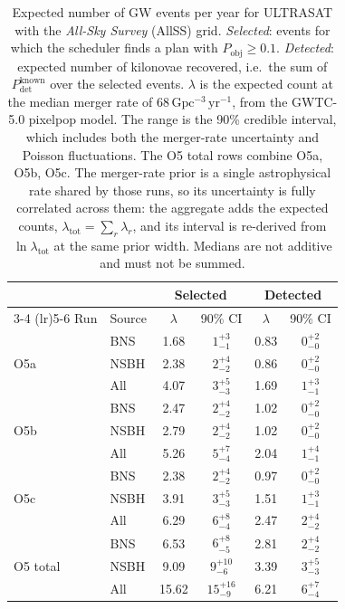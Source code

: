 \begin{table}[!htb]
\centering
\renewcommand\arraystretch{1.15}
\setlength{\tabcolsep}{0.22cm}
\caption{Expected number of GW events per year for ULTRASAT with the \emph{All-Sky Survey} (AllSS) grid. \emph{Selected}: events for which the scheduler finds a plan with $P_\mathrm{obj} \geq 0.1$. \emph{Detected}: expected number of kilonovae recovered, i.e.\ the sum of $P_\mathrm{det}^\mathrm{known}$ over the selected events. $\lambda$ is the expected count at the median merger rate of 68\,$\mathrm{Gpc^{-3}\,yr^{-1}}$, from the GWTC-5.0 pixelpop model. The range is the 90\% credible interval, which includes both the merger-rate uncertainty and Poisson fluctuations. The O5 total rows combine O5a, O5b, O5c. The merger-rate prior is a single astrophysical rate shared by those runs, so its uncertainty is fully correlated across them: the aggregate adds the expected counts, $\lambda_\mathrm{tot} = \sum_r \lambda_r$, and its interval is re-derived from $\ln \lambda_\mathrm{tot}$ at the same prior width. Medians are not additive and must not be summed.}
\label{tab:ultrasat-allsky-selected-detected-1yr}
\begin{tabular}{llcccc}
\toprule
 & & \multicolumn{2}{c}{Selected} & \multicolumn{2}{c}{Detected} \\
\cmidrule(lr){3-4} \cmidrule(lr){5-6}
Run & Source & $\lambda$ & 90\% CI & $\lambda$ & 90\% CI \\
\midrule
\multirow{3}{*}{O5a} & BNS  & 1.68 & $1^{+3}_{-1}$ & 0.83 & $0^{+2}_{-0}$ \\
                     & NSBH & 2.38 & $2^{+4}_{-2}$ & 0.86 & $0^{+2}_{-0}$ \\
                     & All  & 4.07 & $3^{+5}_{-3}$ & 1.69 & $1^{+3}_{-1}$ \\
\midrule
\multirow{3}{*}{O5b} & BNS  & 2.47 & $2^{+4}_{-2}$ & 1.02 & $0^{+2}_{-0}$ \\
                     & NSBH & 2.79 & $2^{+4}_{-2}$ & 1.02 & $0^{+2}_{-0}$ \\
                     & All  & 5.26 & $5^{+7}_{-4}$ & 2.04 & $1^{+4}_{-1}$ \\
\midrule
\multirow{3}{*}{O5c} & BNS  & 2.38 & $2^{+4}_{-2}$ & 0.97 & $0^{+2}_{-0}$ \\
                     & NSBH & 3.91 & $3^{+5}_{-3}$ & 1.51 & $1^{+3}_{-1}$ \\
                     & All  & 6.29 & $6^{+8}_{-4}$ & 2.47 & $2^{+4}_{-2}$ \\
\midrule
\multirow{3}{*}{O5 total} & BNS  & 6.53 & $6^{+8}_{-5}$ & 2.81 & $2^{+4}_{-2}$ \\
                          & NSBH & 9.09 & $9^{+10}_{-6}$ & 3.39 & $3^{+5}_{-3}$ \\
                          & All  & 15.62 & $15^{+16}_{-9}$ & 6.21 & $6^{+7}_{-4}$ \\
\bottomrule
\end{tabular}
\end{table}

